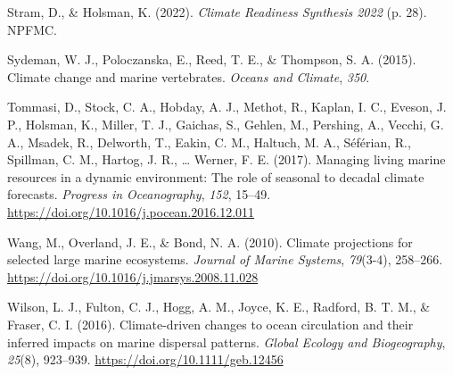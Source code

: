 \documentclass[
  12pt,
]{article}
\newlength{\cslhangindent}
\newenvironment{CSLReferences}[2] %
 {\begin{list}{}{%
  \setlength{\itemindent}{0pt}
  \setlength{\leftmargin}{0pt}
  \setlength{\parsep}{0pt}
  \ifodd #1
   \setlength{\leftmargin}{\cslhangindent}
   \setlength{\itemindent}{-1\cslhangindent}
  \fi
  \setlength{\itemsep}{#2\baselineskip}}}
 {\end{list}}
\begin{document}
\begin{CSLReferences}{1}{2}
Stram, D., \& Holsman, K. (2022). \emph{Climate {Readiness Synthesis} 2022} (p. 28). NPFMC.

Sydeman, W. J., Poloczanska, E., Reed, T. E., \& Thompson, S. A. (2015). Climate change and marine vertebrates. \emph{Oceans and Climate}, \emph{350}.

Tommasi, D., Stock, C. A., Hobday, A. J., Methot, R., Kaplan, I. C., Eveson, J. P., Holsman, K., Miller, T. J., Gaichas, S., Gehlen, M., Pershing, A., Vecchi, G. A., Msadek, R., Delworth, T., Eakin, C. M., Haltuch, M. A., Séférian, R., Spillman, C. M., Hartog, J. R., \ldots{} Werner, F. E. (2017). Managing living marine resources in a dynamic environment: The role of seasonal to decadal climate forecasts. \emph{Progress in Oceanography}, \emph{152}, 15--49. \url{https://doi.org/10.1016/j.pocean.2016.12.011}

Wang, M., Overland, J. E., \& Bond, N. A. (2010). Climate projections for selected large marine ecosystems. \emph{Journal of Marine Systems}, \emph{79}(3-4), 258--266. \url{https://doi.org/10.1016/j.jmarsys.2008.11.028}

Wilson, L. J., Fulton, C. J., Hogg, A. M., Joyce, K. E., Radford, B. T. M., \& Fraser, C. I. (2016). Climate{-}driven changes to ocean circulation and their inferred impacts on marine dispersal patterns. \emph{Global Ecology and Biogeography}, \emph{25}(8), 923--939. \url{https://doi.org/10.1111/geb.12456}

\end{CSLReferences}
\end{document}

